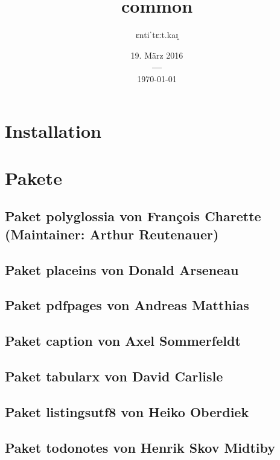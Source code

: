 \documentclass[a4paper,12pt]{article}
\title{\fontspec{Times New Roman}common}
\author{\fontspec{Times New Roman}ɛntiˈtɛːt.kaɪ̯}
\date{%
			{\fontspec{Times New Roman}19. März 2016} \\
			{\bf---} \\[0.2\baselineskip]
			\fontspec{Times New Roman}\today}
\begin{document}
		\listoftodos

		

		\maketitle

		

		\tableofcontents  %

		\chapter{Installation}
		\chapter{Pakete}
			\section{Paket polyglossia von François Charette (Maintainer: Arthur
				Reutenauer)}
				
			\section{Paket placeins von Donald Arseneau}
				
			\section{Paket pdfpages von Andreas Matthias}
				
			\section{Paket caption von Axel Sommerfeldt}
				
			\section{Paket tabularx von David Carlisle}
				
			\section{Paket listingsutf8 von Heiko Oberdiek}
				
			\section{Paket todonotes von Henrik Skov Midtiby}
				
\end{document}
